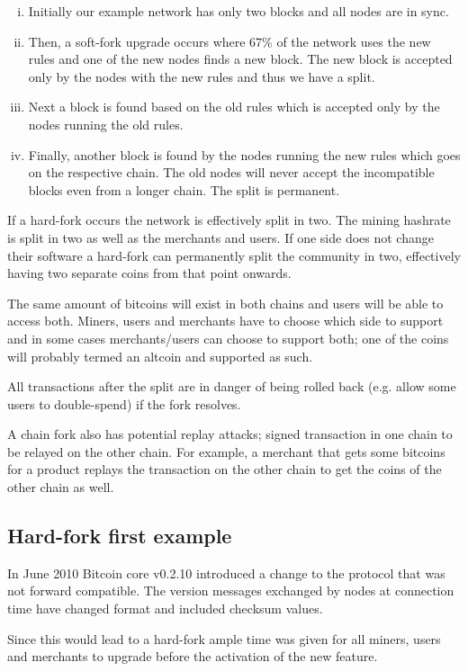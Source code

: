 \begin{enumerate}[(i)]
\item Initially our example network has only two blocks and all nodes are in sync.
\item Then, a soft-fork upgrade occurs where 67\% of the network uses the new rules and one of the new nodes finds a new block. The new block is accepted only by the nodes with the new rules and thus we have a split.
\item Next a block is found based on the old rules which is accepted only by the nodes running the old rules.
\item Finally, another block is found by the nodes running the new rules which goes on the respective chain. The old nodes will never accept the incompatible blocks even from a longer chain. The split is permanent.
\end{enumerate}


If a hard-fork occurs the network is effectively split in two. The mining hashrate is split in two as well as the merchants and users. If one side does not change their software a hard-fork can permanently split the community in two, effectively having two separate coins from that point onwards.

The same amount of bitcoins will exist in both chains and users will be able to access both. Miners, users and merchants have to choose which side to support and in some cases merchants/users can choose to support both; one of the coins will probably termed an altcoin and supported as such.

All transactions after the split are in danger of being rolled back (e.g. allow some users to double-spend) if the fork resolves. 

A chain fork also has potential replay attacks; signed transaction in one chain to be relayed on the other chain. For example, a merchant that gets some bitcoins for a product replays the transaction on the other chain to get the coins of the other chain as well.

\subsection*{Hard-fork first example}
In June 2010 Bitcoin core v0.2.10 introduced a change to the protocol that was not forward compatible. The version messages exchanged by nodes at connection time have changed format and included checksum values.

Since this would lead to a hard-fork ample time was given for all miners, users and merchants to upgrade before the activation of the new feature.

